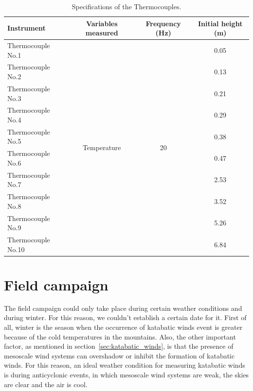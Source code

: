 \begin{table}[!ht]
    \centering
    \begin{tabular}{ | l | c | c | c |}
    \hline
    \textbf{Instrument} & \textbf{Variables measured} & \textbf{Frequency (Hz)} & \textbf{Initial height (m)} \\ [0.5ex]  \hline\hline
    Thermocouple No.1 & \multirow{10}{*}{Temperature} & \multirow{10}{*}{20} &  0.05\\
    Thermocouple No.2 & &  &  0.13\\
    Thermocouple No.3 & &  &  0.21\\
    Thermocouple No.4 &  &  &  0.29\\
    Thermocouple No.5 & &  &  0.38\\
    Thermocouple No.6 &  &  &  0.47\\
    Thermocouple No.7 & &  &  2.53\\
    Thermocouple No.8 &  &  &  3.52\\
    Thermocouple No.9 &  &  &  5.26\\
    Thermocouple No.10 &  &  & 6.84 \\
    \hline
    
    \end{tabular}
    \caption{Specifications of the Thermocouples.}
    \label{tab:intruments_thermocouples}
\end{table}


\section{Field campaign}

The field campaign could only take place during certain weather conditions and during winter. For this reason, we couldn't establish a certain date for it. First of all, winter is the season when the occurrence of katabatic winds event is greater because of the cold temperatures in the mountains. Also, the other important factor, as mentioned in section~\ref{sec:katabatic_winds}, is that the presence of mesoscale wind systems can overshadow or inhibit the formation of katabatic winds. For this reason, an ideal weather condition for measuring katabatic winds is during anticyclonic events, in which mesoscale wind systems are weak, the skies are clear and the air is cool.

